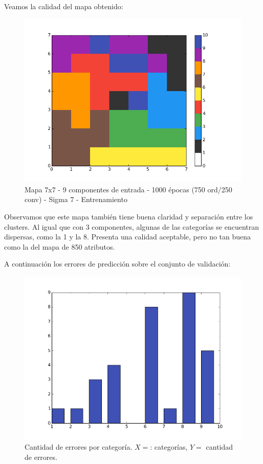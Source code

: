 Veamos la calidad del mapa obtenido:

\begin{figure}[!htbp]
  \begin{center}
    \includegraphics[scale=0.48]{../img/map7x7_1000ep_9en_sigma7_faseord750.png}
  \caption{Mapa 7x7 - 9 componentes de entrada - 1000 épocas (750 ord/250 conv) - Sigma 7 - Entrenamiento}
  \end{center}
\end{figure}

Observamos que este mapa también tiene buena claridad y separación entre los clusters. Al igual que con 3 componentes, algunas de las categorías se encuentran dispersas, como la 1 y la 8.
Presenta una calidad aceptable, pero no tan buena como la del mapa de 850 atributos.

A continuación los errores de predicción sobre el conjunto de validación:

\begin{figure}[!htbp]
  \begin{center}
    \includegraphics[scale=0.45]{../img/validation_1000ep_9en_sigma7_faseord750.png}
  \caption{Cantidad de errores por categoría. $X=$: categorías, $Y=$ cantidad de errores.}
  \end{center}
\end{figure}

